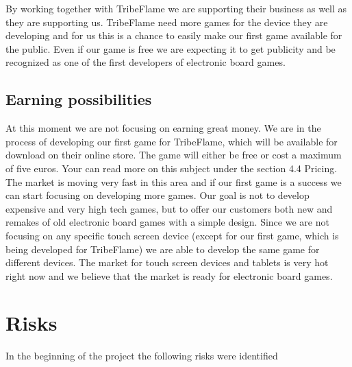 \documentclass[12pt,a4paper]{article}
\begin{document}
By working together with TribeFlame we are supporting their business as well as they are supporting us. TribeFlame need more games for the device they are developing and for us this is a chance to easily make our first game available for the public. Even if our game is free we are expecting it to get publicity and be recognized as one of the first developers of electronic board games.

\subsection{Earning possibilities}
At this moment we are not focusing on earning great money. We are in the process of developing our first game for TribeFlame, which will be available for download on their online store. The game will either be free or cost a maximum of five euros. Your can read more on this subject under the section 4.4 Pricing. The market is moving very fast in this area and if our first game is a success we can start focusing on developing more games. Our goal is not to develop expensive and very high tech games, but to offer our customers both new and remakes of old electronic board games with a simple design. Since we are not focusing on any specific touch screen device (except for our first game, which is being developed for TribeFlame) we are able to develop the same game for different devices. The market for touch screen devices and tablets is very hot right now and we believe that the market is ready for electronic board games.

\section{Risks}
In the beginning of the project the following risks were identified
\end{document}
